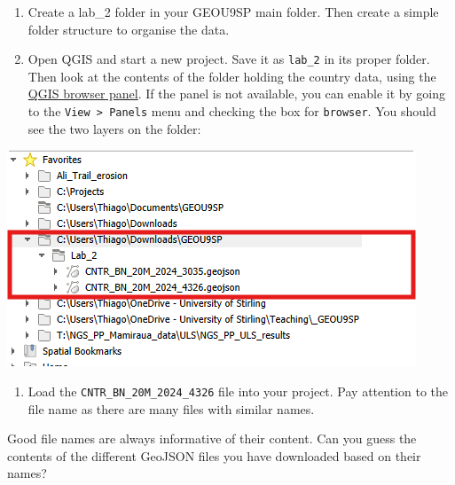 \documentclass[
  letterpaper,
  DIV=11,
  numbers=noendperiod]{scrreprt}
\providecommand{\tightlist}{%
  \setlength{\itemsep}{0pt}\setlength{\parskip}{0pt}}\usepackage{longtable,booktabs,array}
\begin{document}
\begin{enumerate}
\def\labelenumi{(\arabic{enumi})}
\setcounter{enumi}{45}
\item
  Create a lab\_2 folder in your GEOU9SP main folder. Then create a
  simple folder structure to organise the data.
\item
  Open QGIS and start a new project. Save it as \texttt{lab\_2} in its
  proper folder. Then look at the contents of the folder holding the
  country data, using the
  \href{https://docs.qgis.org/3.34/en/docs/user_manual/managing_data_source/opening_data.html\#the-browser-panel}{QGIS
  browser panel}. If the panel is not available, you can enable it by
  going to the \texttt{View\ \textgreater{}\ Panels} menu and checking
  the box for \texttt{browser}. You should see the two layers on the
  folder:
\end{enumerate}

\includegraphics{images/lab_2/lab_2_img2_layers.png}

\begin{enumerate}
\def\labelenumi{(\arabic{enumi})}
\setcounter{enumi}{47}
\tightlist
\item
  Load the \texttt{CNTR\_BN\_20M\_2024\_4326} file into your project.
  Pay attention to the file name as there are many files with similar
  names.
\end{enumerate}

\begin{tcolorbox}[enhanced jigsaw, coltitle=black, toprule=.15mm, breakable, opacitybacktitle=0.6, left=2mm, colback=white, leftrule=.75mm, rightrule=.15mm, colbacktitle=quarto-callout-important-color!10!white, toptitle=1mm, titlerule=0mm, colframe=quarto-callout-important-color-frame, arc=.35mm, bottomtitle=1mm, opacityback=0, bottomrule=.15mm, title=\textcolor{quarto-callout-important-color}{\faExclamation}\hspace{0.5em}{Stop and Think}]

Good file names are always informative of their content. Can you guess
the contents of the different GeoJSON files you have downloaded based on
their names?

\end{tcolorbox}
\end{document}
